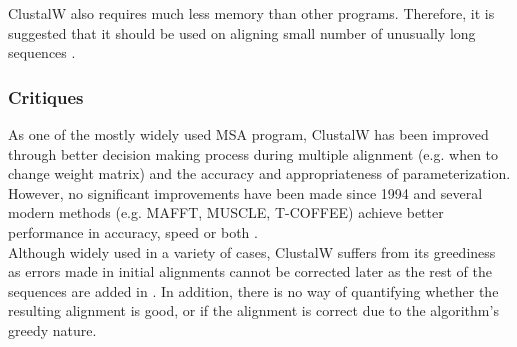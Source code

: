 \documentclass[10pt,twocolumn]{article}
\begin{document}
ClustalW also requires much less memory than other programs. Therefore, it is suggested that it should be used on aligning small number of unusually long sequences \cite{edgar2006multiple}.\\

\subsubsection*{Critiques}
As one of the mostly widely used MSA program, ClustalW has been improved through better decision making process during multiple alignment (e.g. when to change weight matrix) and the accuracy and appropriateness of parameterization. However, no significant improvements have been made since 1994 and several modern methods (e.g. MAFFT, MUSCLE, T-COFFEE) achieve better performance in accuracy, speed or both \cite{edgar2006multiple}.\\

Although widely used in a variety of cases, ClustalW suffers from its greediness as errors made in initial alignments cannot be corrected later as the rest of the sequences are added in \cite{tamura2004prospects}. In addition, there is no way of quantifying whether the resulting alignment is good, or if the alignment is correct due to the algorithm's greedy nature.\\
\end{document}
